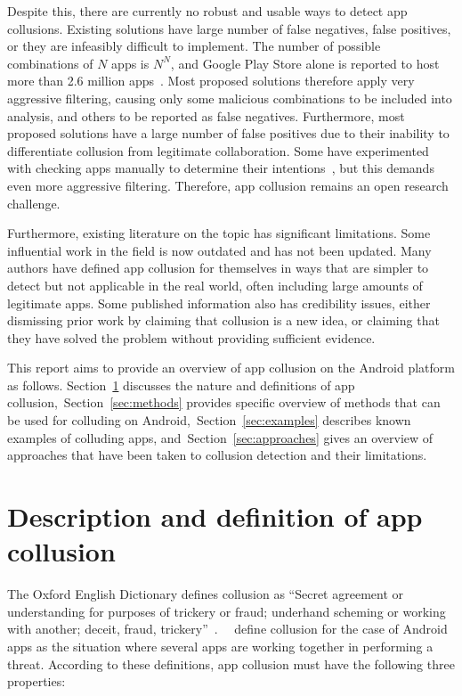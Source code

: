 \documentclass[article, oneside]{aaltoseries}
\newcommand{\Sref}[1]{Section~\ref{#1}}
\begin{document}
Despite this, there are currently no robust and usable ways to detect app collusions. Existing solutions have large number of false negatives, false positives, or they are infeasibly difficult to implement. The number of possible combinations of $N$ apps is $N^N$, and Google Play Store alone is reported to host more than 2.6 million apps~\cite{Statista2018}. Most proposed solutions therefore apply very aggressive filtering, causing only some malicious combinations to be included into analysis, and others to be reported as false negatives. Furthermore, most proposed solutions have a large number of false positives due to their inability to differentiate collusion from legitimate collaboration. Some have experimented with checking apps manually to determine their intentions~\cite{Muttik2016}, but this demands even more aggressive filtering. Therefore, app collusion remains an open research challenge.

Furthermore, existing literature on the topic has significant limitations. Some influential work in the field is now outdated and has not been updated. Many authors have defined app collusion for themselves in ways that are simpler to detect but not applicable in the real world, often including large amounts of legitimate apps. Some published information also has credibility issues, either dismissing prior work by claiming that collusion is a new idea, or claiming that they have solved the problem without providing sufficient evidence.

This report aims to provide an overview of app collusion on the Android platform as follows. \Sref{sec:def} discusses the nature and definitions of app collusion,~\Sref{sec:methods} provides specific overview of methods that can be used for colluding on Android,~\Sref{sec:examples} describes known examples of colluding apps, and~\Sref{sec:approaches} gives an overview of approaches that have been taken to collusion detection and their limitations.

\section{Description and definition of app collusion}
\label{sec:def}

The Oxford English Dictionary defines collusion as ``Secret agreement or understanding for purposes of trickery or fraud; underhand scheming or working with another; deceit, fraud, trickery''~\cite{OEDcollusion}.~\citeauthor{Asavoae2017}~\cite{Asavoae2017} define collusion for the case of Android apps as the situation where several apps are working together in performing a threat. According to these definitions, app collusion must have the following three properties:
\end{document}
